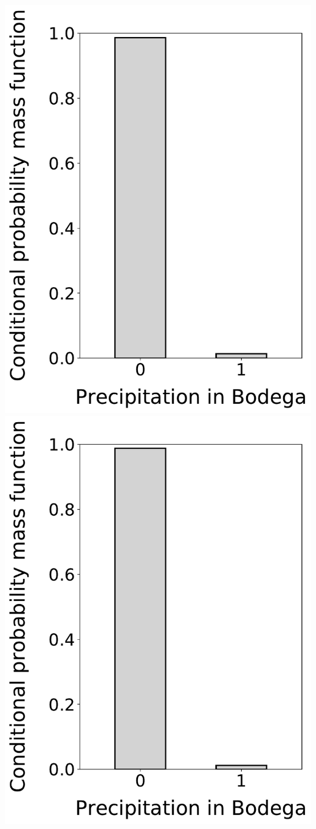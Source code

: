 \documentclass[12pt,twoside]{article}
\begin{document}
\begin{enumerate}
\includegraphics[scale=.5]{precipitation_cond_pmf_1_given_2eq0.pdf}
\includegraphics[scale=.5]{precipitation_cond_pmf_1_given_2eq0_3eq0.pdf}

\end{enumerate}
\end{document}
